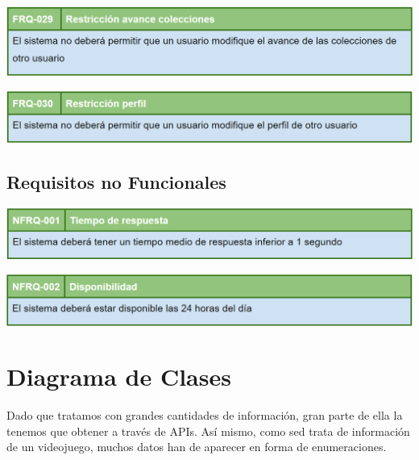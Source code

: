 	\bigskip
	
	\includegraphics[width=\textwidth]{img/cap5/FR/29.png}
	
	\bigskip
	
	\includegraphics[width=\textwidth]{img/cap5/FR/30.png}

	\subsection{Requisitos no Funcionales}
	
	\bigskip
	
	\includegraphics[width=\textwidth]{img/cap5/NFR/1.png}
	
	\bigskip
	
	\includegraphics[width=\textwidth]{img/cap5/NFR/2.png}
	
\section{Diagrama de Clases}

	\bigskip

	Dado que tratamos con grandes cantidades de información, gran parte de ella la tenemos que obtener a través de APIs. Así mismo, como sed trata de información de un videojuego, muchos datos han de aparecer en forma de enumeraciones.
	
	\bigskip
	
